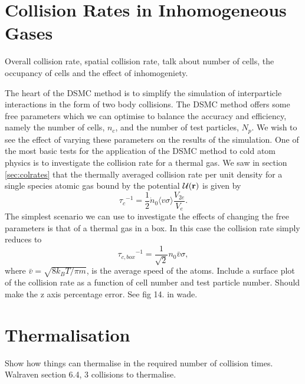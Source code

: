 
\section{Collision Rates in Inhomogeneous Gases}

Overall collision rate, spatial collision rate, talk about number of cells, the occupancy of cells and the effect of inhomogeniety.

The heart of the DSMC method is to simplify the simulation of interparticle interactions in the form of two body collisions. 
The DSMC method offers some free parameters which we can optimise to balance the accuracy and efficiency, namely the number of cells, $n_c$, and the number of test particles, $N_p$.
We wish to see the effect of varying these parameters on the results of the simulation.
One of the most basic tests for the application of the DSMC method to cold atom physics is to investigate the collision rate for a thermal gas. 
We saw in section \ref{sec:colrates} that the thermally averaged collision rate per unit density for a single species atomic gas bound by the potential $\cal{U}(\mathbf{r})$ is given by
\begin{equation}
    {\tau_c}^{-1} = \frac{1}{2}\dot{n}_{0}\langle v\sigma \rangle \frac{V_{2e}}{V_e}.
\end{equation}
The simplest scenario we can use to investigate the effects of changing the free parameters is that of a thermal gas in a box. 
In this case the collision rate simply reduces to 
\begin{equation*}
    {\tau_{c,box}}^{-1} = \frac{1}{\sqrt{2}}n_0\bar{v}\sigma,
\end{equation*}
where $\bar{v}=\sqrt{8k_{B}T/\pi m}$, is the average speed of the atoms.
Include a surface plot of the collision rate as a function of cell number and test particle number.
Should make the z axis percentage error. See fig 14. in wade.


\section{Thermalisation}

Show how things can thermalise in the required number of collision times.
Walraven section 6.4, 3 collisions to thermalise.

